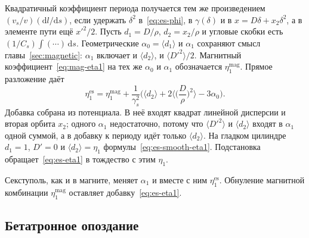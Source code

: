 \documentclass[aps,pra,preprint,a4paper,amsmath,amssymb,longbibliography]{revtex4-2}
\begin{document}
Квадратичный коэффициент периода получается тем же произведением $(v_s/v)(\mathrm{d}l/\mathrm{d}s)$, если удержать $\delta^2$ в~\eqref{eq:es-phi}, в $\gamma(\delta)$ и в $x=D\delta+x_2\delta^2$, а в элементе пути ещё $x'^2/2$. Пусть $d_1=D/\rho$, $d_2=x_2/\rho$ и угловые скобки есть $(1/C_s)\int(\cdots)\,\mathrm{d}s$. Геометрические $\alpha_0=\langle d_1\rangle$ и $\alpha_1$ сохраняют смысл главы~\ref{sec:magnetic}: $\alpha_1$ включает и $\langle d_2\rangle$, и $\langle D'^2\rangle/2$. Магнитный коэффициент~\eqref{eq:mag-eta1} на тех же $\alpha_0$ и $\alpha_1$ обозначается $\eta_1^{\mathrm{mag}}$. Прямое разложение даёт
\begin{equation}
\label{eq:es-eta1}
\eta_1^{\mathrm{es}}
=\eta_1^{\mathrm{mag}}
+\frac{1}{\gamma_s^2}
\Biggl(
\langle d_2\rangle
+2\Biggl\langle\Biggl(\frac{D}{\rho}\Biggr)^2\Biggr\rangle
-3\alpha_0
\Biggr).
\end{equation}
Добавка собрана из потенциала. В неё входят квадрат линейной дисперсии и вторая орбита $x_2$; одного $\alpha_1$ недостаточно, потому что $\langle D'^2\rangle$ и $\langle d_2\rangle$ входят в $\alpha_1$ одной суммой, а в добавку к периоду идёт только $\langle d_2\rangle$. На гладком цилиндре $d_1=1$, $D'=0$ и $\langle d_2\rangle=\eta_1$ формулы~\eqref{eq:es-smooth-eta1}. Подстановка обращает~\eqref{eq:es-eta1} в тождество с этим $\eta_1$.

Секступоль, как и в магните, меняет $\alpha_1$ и вместе с ним $\eta_1^{\mathrm{es}}$. Обнуление магнитной комбинации $\eta_1^{\mathrm{mag}}$ оставляет добавку~\eqref{eq:es-eta1}.

\subsection{Бетатронное опоздание}
\label{sec:es-lambda}
\end{document}
